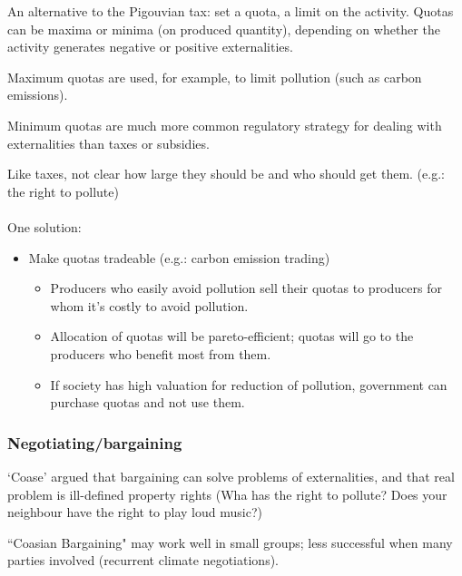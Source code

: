 \documentclass[12pt, a4paper, titlepage]{extarticle}
\begin{document}
	An alternative to the Pigouvian tax: set a quota, a limit on the activity. Quotas can be maxima or minima (on produced quantity), depending on whether the activity generates negative or positive externalities.
	
	Maximum quotas are used, for example, to limit pollution (such as carbon emissions).
	
	Minimum quotas are much more common regulatory strategy for dealing with externalities than taxes or subsidies.
	
	Like taxes, not clear how large they should be and who should get them. (e.g.: the right to pollute)\\
	\\
	One solution:
	\begin{itemize}
		\item Make quotas tradeable (e.g.: carbon emission trading)
		\begin{itemize}
			\item Producers who easily avoid pollution sell their quotas to producers for whom it's costly to avoid pollution.
			\item Allocation of quotas will be pareto-efficient; quotas will go to the producers who benefit most from them.
			\item If society has high valuation for reduction of pollution, government can purchase quotas and not use them.
		\end{itemize}
	\end{itemize}
	
	\subsubsection*{Negotiating/bargaining}
	`Coase' argued that bargaining can solve problems of externalities, and that real problem is ill-defined property rights (Wha has the right to pollute? Does your neighbour have the right to play loud music?)
	
	``Coasian Bargaining" may work well in small groups; less successful when many parties involved (recurrent climate negotiations).
	
\end{document}
